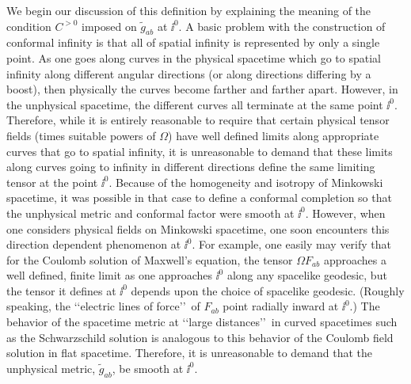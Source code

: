 We begin our discussion of this definition by explaining the meaning of the
condition \(C^{>0}\) imposed on \(\tilde g_{ab}\) at \(\ii^0\). A basic problem with the
construction of conformal infinity is that all of spatial infinity is represented by
only a single point. As one goes along curves in the physical spacetime which go to
spatial infinity along different angular directions (or along directions differing by
a boost), then physically the curves become farther and farther apart. However, in
the unphysical spacetime, the different curves all terminate at the same point \(\ii^0\).
Therefore, while it is entirely reasonable to require that certain physical tensor
fields (times suitable powers of \(\Omega\)) have well defined limits along
appropriate curves that go to spatial infinity, it is unreasonable to demand that
these limits along curves going to infinity in different directions define the same
limiting tensor at the point \(\ii^0\). Because of the homogeneity and isotropy of
Minkowski spacetime, it was possible in that case to define a conformal completion so
that the unphysical metric and conformal factor were smooth at \(\ii^0\). However,
when one considers physical fields on Minkowski spacetime, one soon encounters this
direction dependent phenomenon at \(\ii^0\). For example, one easily may verify that
for the Coulomb solution of Maxwell's equation, the tensor \(\Omega F_{ab}\)
approaches a well defined, finite limit as one approaches \(\ii^0\) along any spacelike
geodesic, but the tensor it defines at \(\ii^0\) depends upon the choice of spacelike
geodesic. (Roughly speaking, the \lq\lq electric lines of force\rq\rq\ of \(F_{ab}\) point
radially inward at \(\ii^0\).) The behavior of the spacetime metric at \lq\lq large
distances\rq\rq\ in curved spacetimes such as the Schwarzschild solution is analogous
to this behavior of the Coulomb field solution in flat spacetime. Therefore, it is
unreasonable to demand that the unphysical metric, \(\tilde g_{ab}\), be smooth at
\(\ii^0\).


